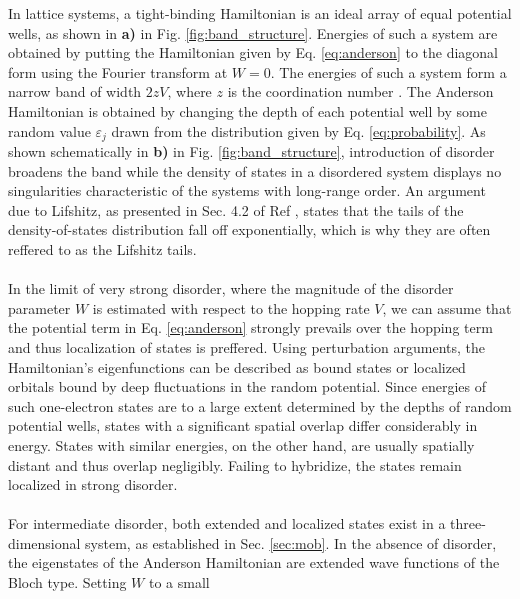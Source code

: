 \documentclass[10pt,a4paper]{article}
\begin{document}
\begin{minipage}[t]{0.56\textwidth} 
In lattice systems, a tight-binding Hamiltonian is an ideal array of equal potential wells, as shown in \textbf{a)} in Fig. \ref{fig:band_structure}. Energies of such a system are obtained by putting the Hamiltonian given by Eq. \eqref{eq:anderson} to the diagonal form using the Fourier transform at $W=0.$ The energies of such a system form a narrow band of width $2zV$, where $z$ is the coordination number \cite{Mott}. The Anderson Hamiltonian is obtained by changing the depth of each potential well by some random value $\varepsilon_j$ drawn from the distribution given by Eq. \eqref{eq:probability}. As shown schematically in \textbf{b)} in Fig. \ref{fig:band_structure}, introduction of disorder broadens the band while the density of states in a disordered system displays no singularities characteristic of the systems with long-range order. An argument due to Lifshitz, as presented in Sec. 4.2 of Ref \cite{Kramer}, states that the tails of the density-of-states distribution fall off exponentially, which is why they are often reffered to as the Lifshitz tails. \\\\
\noindent In the limit of very strong disorder, where the magnitude of the disorder parameter $W$ is estimated with respect to the hopping rate $V$, we can assume that the potential term in Eq. \eqref{eq:anderson} strongly prevails over the hopping term and thus localization of states is preffered. Using perturbation arguments, the Hamiltonian's eigenfunctions can be described as bound states or localized orbitals bound by deep fluctuations in the random potential. Since energies of such one-electron states are to a large extent determined by the depths of random potential wells, states with a significant spatial overlap differ considerably in energy. States with similar energies, on the other hand, are usually spatially distant and thus overlap negligibly. Failing to hybridize,  the states remain localized in strong disorder. \\\\
\noindent For intermediate disorder, both extended and localized states exist in a three-dimensional system, as established in Sec. \ref{sec:mob}. In the absence of disorder, the eigenstates of the Anderson Hamiltonian are extended wave functions of the Bloch type. Setting $W$ to a small  
\end{minipage}\hfill
\end{document}
